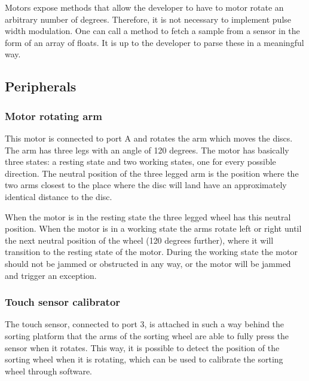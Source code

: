 \documentclass[a4paper,oneside,11pt]{article}
\begin{document}
Motors expose methods that allow the developer to have to motor rotate an arbitrary number of degrees. Therefore, it is not necessary to implement pulse width modulation. One can call a method to fetch a sample from a sensor in the form of an array of floats. It is up to the developer to parse these in a meaningful way.

\subsection{Peripherals}

\subsubsection{Motor rotating arm}
This motor is connected to port A and rotates the arm which moves the discs. The arm has three legs with an angle of 120 degrees. The motor has basically three states: a resting state and two working states, one for every possible direction. The neutral position of the three legged arm is the position where the two arms closest to the place where the disc will land have an approximately identical distance to the disc.

When the motor is in the resting state the three legged wheel has this neutral position. When the motor is in a working state the arms rotate left or right until the next neutral position of the wheel (120 degrees further), where it will transition to the resting state of the motor. During the working state the motor should not be jammed or obstructed in any way, or the motor will be jammed and trigger an exception.

\subsubsection{Touch sensor calibrator}
The touch sensor, connected to port 3, is attached in such a way behind the sorting platform that the arms of the sorting wheel are able to fully press the sensor when it rotates. This way, it is possible to detect the position of the sorting wheel when it is rotating, which can be used to calibrate the sorting wheel through software.
\end{document}
